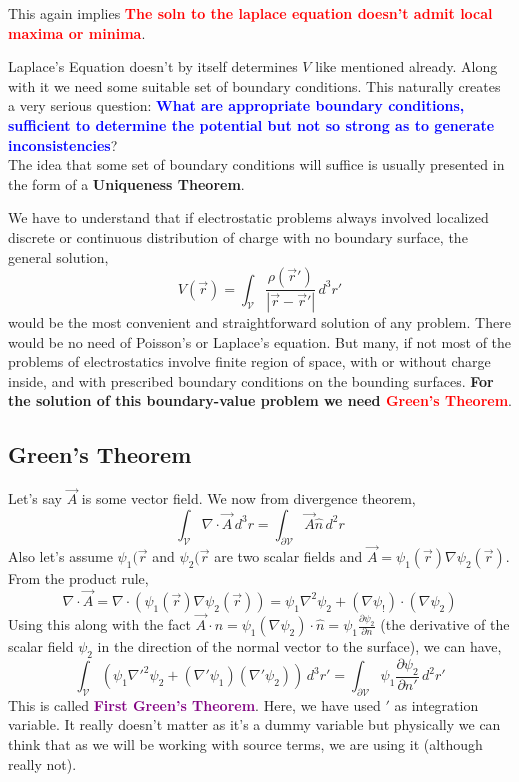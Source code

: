 \documentclass{article}
\begin{document}
This again implies \textcolor{red}{\textbf{The soln to the laplace equation doesn't admit local maxima or minima}}.

Laplace's Equation doesn't by itself determines $V$ like mentioned already. Along with it we need some suitable set of boundary conditions. This naturally creates a very serious question: \textcolor{blue}{\textbf{What are appropriate boundary conditions, sufficient to determine the potential but not so strong as to generate inconsistencies}}?\\
The idea that some set of boundary conditions will suffice is usually presented in the form of a \textbf{Uniqueness Theorem}. 

We have to understand that if electrostatic problems always involved localized discrete or continuous distribution of charge with no boundary surface, the general solution,
\begin{equation}
    V(\vec{r})=\int_{\mathcal{V}} \frac{\rho(\vec{r}')}{|\vec{r}-\vec{r}'|}\, d^3r'
    \label{pot_estat_g}
\end{equation}
would be the most convenient and straightforward solution of any problem. There would be no need of Poisson's or Laplace's equation. But many, if not most of the problems of electrostatics involve finite region of space, with or without charge inside, and with prescribed boundary conditions on the bounding surfaces. \textbf{For the solution of this boundary-value problem we need \textcolor{red}{Green's Theorem}}.
\subsection{Green's Theorem}
Let's say $\vec{A}$ is some vector field. We now from divergence theorem,
\begin{equation}
    \int_{\mathcal{V}}\nabla\cdot \vec{A}\, d^3r = \int_{\mathcal{\partial V}}\vec{A} \hat{n}\, d^2r
\end{equation}
Also let's assume $\psi_1(\vec{r}$ and $\psi_2(\vec{r}$ are two scalar fields and $\vec{A}=\psi_1(\vec{r})\nabla\psi_2(\vec{r})$. From the product rule,
\begin{equation}
    \nabla \cdot \vec{A} = \nabla \cdot (\psi_1(\vec{r})\nabla\psi_2(\vec{r}))=\psi_1 \nabla^2 \psi_2 + (\nabla \psi_!)\cdot (\nabla \psi_2)
\end{equation}
Using this along with the fact $\vec{A}\cdot n = \psi_1 (\nabla \psi_2)\cdot \hat{n}=\psi_1 \frac{\partial \psi_2}{\partial n}$ (the derivative of the scalar field $\psi_2$ in the direction of the normal vector to the surface), we can have,
\begin{equation}
    \int_{\mathcal{V}} (\psi_1 \nabla'^2 \psi_2 + (\nabla' \psi_1)(\nabla' \psi_2))\, d^3 r' = \int_{\partial \mathcal{V}}\psi_1 \frac{\partial \psi_2}{\partial n'}\, d^2 r'
    \label{green_th_1}
\end{equation}
This is called \textcolor{purple}{\textbf{First Green's Theorem}}. Here, we have used $'$ as integration variable. It really doesn't matter as it's a dummy variable but physically we can think that as we will be working with source terms, we are using it (although really not).
\end{document}
